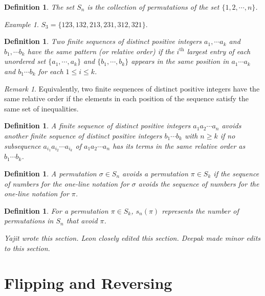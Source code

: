 \documentclass[11pt,letterpaper,twoside,english]{article}
\theoremstyle{theorem}
\newtheorem{definition}[theorem]{Definition}
\theoremstyle{remark}
\newtheorem{remark}[theorem]{Remark}
\newtheorem{example}[theorem]{Example}
\begin{document}
\begin{definition}
The set $S_n$ is the collection of permutations of the set $\{1,2,\cdots, n\}$. 
\end{definition}

\begin{example}
$S_3=\{123,132,213,231,312,321\}$. 
\end{example}








\begin{definition}
Two finite sequences of distinct positive integers $a_1,\cdots a_k$ and $b_1,\cdots b_k$ have the same pattern (or relative order) if the $i^\text{th}$ largest entry of each unordered set $\{a_1,\cdots,a_k\}$ and $\{b_1,\cdots, b_k\}$ appears in the same position in $a_1\cdots a_k$ and $b_1\cdots b_k$ for each $1\le i\le k$. 
\end{definition}

\begin{remark}
Equivalently, two finite sequences of distinct positive integers have the same relative order if the elements in each position of the sequence satisfy the same set of inequalities.
\end{remark}

\begin{definition}
A finite sequence of distinct positive integers $a_1a_2\cdots a_n$ avoids another finite sequence of distinct positive integers $b_1\cdots b_k$ with $n\ge k$ if no subsequence $a_{i_1}a_{i_2}\cdots a_{i_k}$ of $a_1a_2\cdots a_n$ has its terms in the same relative order as $b_1\cdots b_k$. 
\end{definition}


\begin{definition} 
A permutation $\sigma\in S_n$ avoids a permutation $\pi\in S_k$ if the sequence of numbers for the one-line notation for $\sigma$ avoids the sequence of numbers for the one-line notation for $\pi$.
\end{definition}

\begin{definition}
For a permutation $\pi\in S_k$, $s_n(\pi)$ represents the number of permutations in $S_n$ that avoid $\pi$. 
\end{definition}

\emph{Yajit wrote this section. Leon closely edited this section. Deepak made minor edits to this section.}


\section{Flipping and Reversing}
\end{document}
